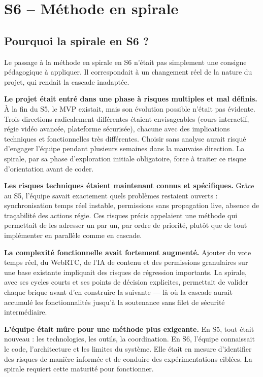 \documentclass[11pt,a4paper]{report}
\begin{document}
\chapter{S6 -- Méthode en spirale}

\section{Pourquoi la spirale en S6 ?}

Le passage à la méthode en spirale en S6 n'était pas simplement une consigne pédagogique à appliquer. Il correspondait à un changement réel de la nature du projet, qui rendait la cascade inadaptée.

\textbf{Le projet était entré dans une phase à risques multiples et mal définis.} À la fin du S5, le MVP existait, mais son évolution possible n'était pas évidente. Trois directions radicalement différentes étaient envisageables (cours interactif, régie vidéo avancée, plateforme sécurisée), chacune avec des implications techniques et fonctionnelles très différentes. Choisir sans analyse aurait risqué d'engager l'équipe pendant plusieurs semaines dans la mauvaise direction. La spirale, par sa phase d'exploration initiale obligatoire, force à traiter ce risque d'orientation avant de coder.

\textbf{Les risques techniques étaient maintenant connus et spécifiques.} Grâce au S5, l'équipe savait exactement quels problèmes restaient ouverts : synchronisation temps réel instable, permissions sans propagation live, absence de traçabilité des actions régie. Ces risques précis appelaient une méthode qui permettait de les adresser un par un, par ordre de priorité, plutôt que de tout implémenter en parallèle comme en cascade.

\textbf{La complexité fonctionnelle avait fortement augmenté.} Ajouter du vote temps réel, du WebRTC, de l'IA de contenu et des permissions granulaires sur une base existante impliquait des risques de régression importants. La spirale, avec ses cycles courts et ses points de décision explicites, permettait de valider chaque brique avant d'en construire la suivante --- là où la cascade aurait accumulé les fonctionnalités jusqu'à la soutenance sans filet de sécurité intermédiaire.

\textbf{L'équipe était mûre pour une méthode plus exigeante.} En S5, tout était nouveau : les technologies, les outils, la coordination. En S6, l'équipe connaissait le code, l'architecture et les limites du système. Elle était en mesure d'identifier des risques de manière informée et de conduire des expérimentations ciblées. La spirale requiert cette maturité pour fonctionner.
\end{document}
